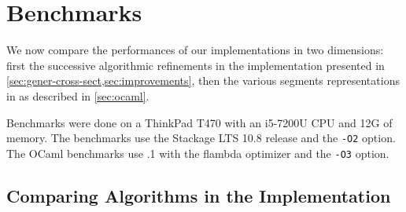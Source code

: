 \section{Benchmarks}
\label{sec:bench}


We now compare the performances of our implementations in two dimensions:
first the successive algorithmic refinements in the \haskell
implementation presented in \cref{sec:gener-cross-sect,sec:improvements},
then the various segments representations in \ocaml
as described in \cref{sec:ocaml}.

Benchmarks were done on a ThinkPad T470 with an i5-7200U CPU and 12G of memory.
The \haskell benchmarks use the Stackage LTS 10.8 release and the \texttt{-O2} option.
The OCaml benchmarks use .1 with the flambda optimizer and the
\texttt{-O3} option.

\subsection{Comparing Algorithms in the \haskell Implementation}

